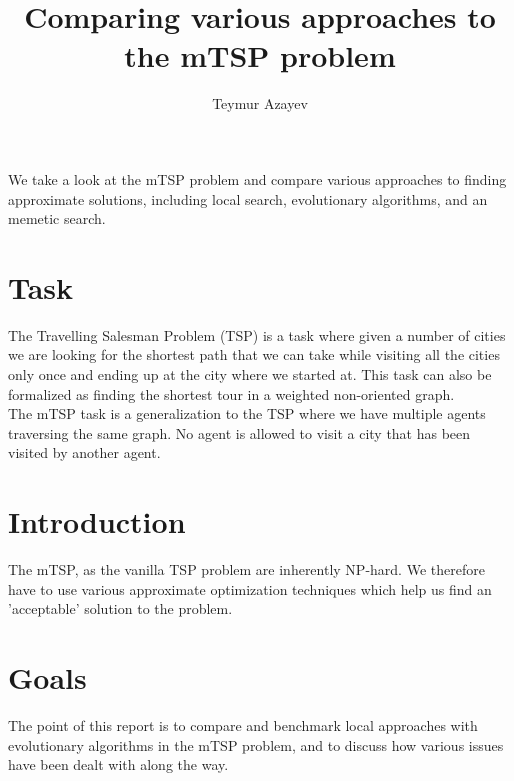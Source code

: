 \documentclass[journal]{IEEEtrancz}
\begin{document}
\title{Comparing various approaches to the mTSP problem}
\author{Teymur Azayev}

\maketitle

\begin{abstrakt}
We take a look at the mTSP problem and compare various approaches to finding approximate solutions, including local search, evolutionary algorithms, and an memetic search.
\end{abstrakt}


\IEEEpeerreviewmaketitle

\section{Task}
The Travelling Salesman Problem (TSP) is a task where given a number of cities we are looking for the shortest path that we can take while visiting all the cities only once and ending up at the city where we started at. 
This task can also be formalized as finding the shortest tour in a weighted non-oriented graph. \\
The mTSP task is a generalization to the TSP where we have multiple agents traversing the same graph. No agent is allowed to visit a city that has been visited by another agent.

\section{Introduction}
The mTSP, as the vanilla TSP problem are inherently NP-hard. We therefore have to use various approximate
optimization techniques which help us find an 'acceptable' solution to the problem.

\section{Goals}
The point of this report is to compare and benchmark local approaches with evolutionary algorithms in the mTSP
problem, and to discuss how various issues have been dealt with along the way.
\end{document}
